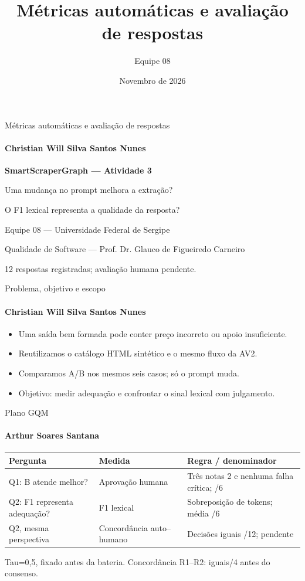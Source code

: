 \documentclass[aspectratio=169,11pt]{beamer}
\title{Métricas automáticas e avaliação de respostas}
\author{Equipe 08}
\date{Novembro de 2026}
\newcommand{\pessoa}[1]{\framesubtitle{#1}}
\begin{document}
\begin{frame}{Métricas automáticas e avaliação de respostas}
\pessoa{Christian Will Silva Santos Nunes}
\textbf{\Large SmartScraperGraph --- Atividade 3}\par\bigskip
Uma mudança no prompt melhora a extração?\par
O F1 lexical representa a qualidade da resposta?\par\bigskip
Equipe 08 --- Universidade Federal de Sergipe\par
Qualidade de Software --- Prof. Dr. Glauco de Figueiredo Carneiro\par\bigskip
\alert{12 respostas registradas; avaliação humana pendente.}
\end{frame}
\begin{frame}{Problema, objetivo e escopo}
\pessoa{Christian Will Silva Santos Nunes}
\begin{itemize}\setlength{\itemsep}{1em}
\item Uma saída bem formada pode conter preço incorreto ou apoio insuficiente.
\item Reutilizamos o catálogo HTML sintético e o mesmo fluxo da AV2.
\item Comparamos A/B nos mesmos seis casos; só o prompt muda.
\item Objetivo: medir adequação e confrontar o sinal lexical com julgamento.
\end{itemize}\end{frame}
\begin{frame}{Plano GQM}
\pessoa{Arthur Soares Santana}
\small\begin{tabular}{@{}p{4.0cm}p{3.3cm}p{6.0cm}@{}}\toprule
Pergunta & Medida & Regra / denominador \\\midrule
Q1: B atende melhor? & Aprovação humana & Três notas 2 e nenhuma falha crítica; /6 \\[0.8em]
Q2: F1 representa adequação? & F1 lexical & Sobreposição de tokens; média /6 \\[0.8em]
Q2, mesma perspectiva & Concordância auto--humano & Decisões iguais /12; pendente \\\bottomrule
\end{tabular}\par\bigskip
Tau=0,5, fixado antes da bateria. Concordância R1--R2: iguais/4 antes do consenso.
\end{frame}
\end{document}
